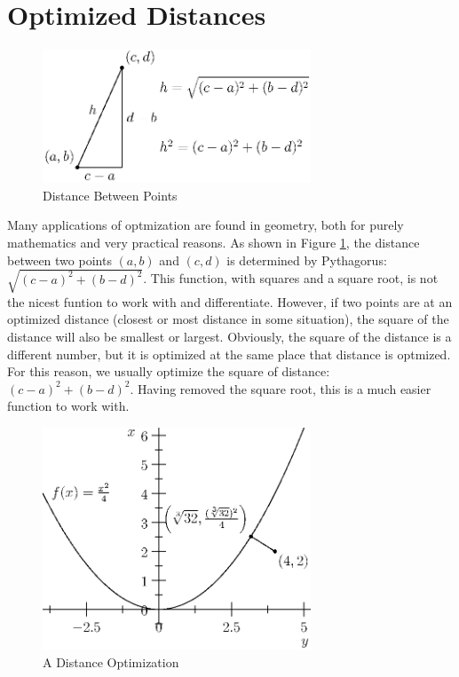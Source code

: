 \documentclass[fleqn]{report}
\begin{document}
\section{Optimized Distances}

\begin{figure}[ht]
\centering
\includegraphics[width=8cm]{figure65.eps}
\caption{Distance Between Points}
\label{Distance Between Points}
\end{figure}

Many applications of optmization are found in geometry, both
for purely mathematics and very practical reasons. As shown in
Figure \ref{Distance Between Points}, the distance between two
points $(a,b)$ and $(c,d)$ is determined by Pythagorus:
$\sqrt{(c-a)^2 + (b-d)^2}$. This function, with squares and a
square root, is not the nicest funtion to work with and
differentiate. However, if two points are at an optimized
distance (closest or most distance in some situation), the
square of the distance will also be smallest or largest.
Obviously, the square of the distance is a different number,
but it is optimized at the same place that distance is
optmized. For this reason, we usually optimize the square of
distance: $(c-a)^2 + (b-d)^2$. Having removed the square root,
this is a much easier function to work with.

\begin{figure}[ht]
\centering
\includegraphics[width=8cm]{figure66.eps}
\caption{A Distance Optimization}
\label{A Distance Optimization}
\end{figure}
\end{document}
